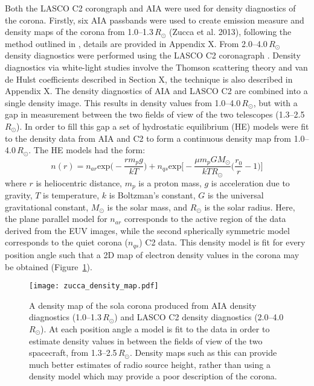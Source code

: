 Both the LASCO C2 corongraph and AIA were used for density diagnostics of the corona. Firstly, six AIA passbands were used to create emission measure and density maps of the corona from 1.0--1.3\,$R_{\odot}$ (Zucca et al. 2013), following the method outlined in \citep{asch2013}, details are provided in Appendix X. From 2.0--4.0\,$R_{\odot}$ density diagnostics were performed using the LASCO C2 coronagraph \citep{van1950}. Density diagnostics via white-light studies involve the Thomson scattering theory and van de Hulst coefficients described in Section X, the technique is also described in Appendix X. The density diagnostics of AIA and LASCO C2 are combined into a single density image. This results in density values from 1.0--4.0\,$R_{\odot}$, but with a gap in measurement between the two fields of view of the two telescopes (1.3--2.5\,$R_{\odot}$). In order to fill this gap a set of hydrostatic equilibrium (HE) models were fit to the density data from AIA and C2 to form a continuous density map from 1.0--4.0\,$R_{\odot}$. The HE models had the form:
\begin{equation}
n(r) = n_{ar}\mathrm{exp}\bigg(-\frac{rm_pg}{kT}\bigg) + n_{qs}\mathrm{exp}\bigg[-\frac{\mu m_pGM_{\odot}}{kTR_{\odot}} \bigg(\frac{r_0}{r}-1\bigg)\bigg]
\end{equation}
where $r$ is heliocentric distance, $m_p$ is a proton mass, $g$ is acceleration due to gravity, $T$ is temperature, $k$ is Boltzman's constant, $G$ is the universal gravitational constant, $M_{\odot}$ is the solar mass, and $R_{\odot}$ is the solar radius. Here, the plane parallel model for $n_{ar}$ corresponds to the active region of the data derived from the EUV images, while the second spherically symmetric model corresponds to the quiet corona ($n_{qs}$) C2 data. This density model is fit for every position angle such that a 2D map of electron density values in the corona may be obtained (Figure~\ref{fig:density_map}).
\begin{figure}[t!]
\begin{center}
\texttt{[image: zucca\_density\_map.pdf]}
\caption{A density map of the sola corona produced from AIA density diagnostics (1.0--1.3\,$R_{\odot}$) and LASCO C2 density diagnostics (2.0--4.0\,$R_{\odot}$). At each position angle a model is fit to the data in order to estimate density values in between the fields of view of the two spacecraft, from 1.3--2.5\,$R_{\odot}$. Density maps such as this can provide much better estimates of radio source height, rather than using a density model which may provide a poor description of the corona.}
\label{fig:density_map}
\end{center}
\end{figure}

